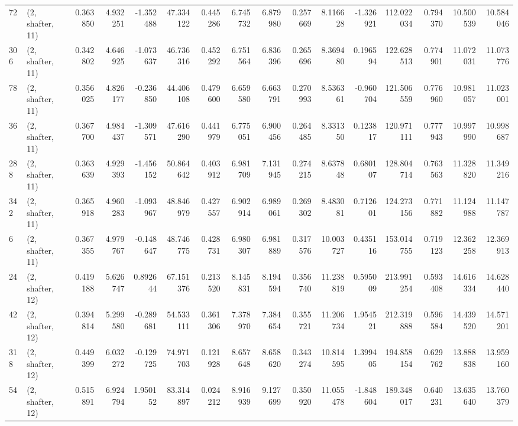 \begin{tabular}{llrrrrrrrrrrrrrr}
72  &  (2, shafter, 11) &   0.363850 &   4.932251 &  -1.352488 &    47.334122 &   0.445286 &   6.745732 &   6.879980 &  0.257669 &   8.116628 &  -1.326921 &   112.022034 &  0.794370 &  10.500539 &  10.584046 \\
306 &  (2, shafter, 11) &   0.342802 &   4.646925 &  -1.073637 &    46.736316 &   0.452292 &   6.751564 &   6.836396 &  0.265696 &   8.369480 &   0.196594 &   122.628513 &  0.774901 &  11.072031 &  11.073776 \\
78  &  (2, shafter, 11) &   0.356025 &   4.826177 &  -0.236850 &    44.406108 &   0.479600 &   6.659580 &   6.663791 &  0.270993 &   8.536361 &  -0.960704 &   121.506559 &  0.776960 &  10.981057 &  11.023001 \\
36  &  (2, shafter, 11) &   0.367700 &   4.984437 &  -1.309571 &    47.616290 &   0.441979 &   6.775051 &   6.900456 &  0.264485 &   8.331350 &   0.123817 &   120.971111 &  0.777943 &  10.997990 &  10.998687 \\
288 &  (2, shafter, 11) &   0.363639 &   4.929393 &  -1.456152 &    50.864642 &   0.403912 &   6.981709 &   7.131945 &  0.274215 &   8.637848 &   0.680107 &   128.804714 &  0.763563 &  11.328820 &  11.349216 \\
342 &  (2, shafter, 11) &   0.365918 &   4.960283 &  -1.093967 &    48.846979 &   0.427557 &   6.902914 &   6.989061 &  0.269302 &   8.483081 &   0.712601 &   124.273156 &  0.771882 &  11.124988 &  11.147787 \\
6   &  (2, shafter, 11) &   0.367355 &   4.979767 &  -0.148647 &    48.746775 &   0.428731 &   6.980307 &   6.981889 &  0.317576 &  10.003727 &   0.435116 &   153.014755 &  0.719123 &  12.362258 &  12.369913 \\
24  &  (2, shafter, 12) &   0.419188 &   5.626747 &   0.892644 &    67.151376 &   0.213520 &   8.145831 &   8.194594 &  0.356740 &  11.238819 &   0.595009 &   213.991254 &  0.593408 &  14.616334 &  14.628440 \\
42  &  (2, shafter, 12) &   0.394814 &   5.299580 &  -0.289681 &    54.533111 &   0.361306 &   7.378970 &   7.384654 &  0.355721 &  11.206734 &   1.954521 &   212.319888 &  0.596584 &  14.439520 &  14.571201 \\
318 &  (2, shafter, 12) &   0.449399 &   6.032272 &  -0.129725 &    74.971703 &   0.121928 &   8.657648 &   8.658620 &  0.343274 &  10.814595 &   1.399405 &   194.858154 &  0.629762 &  13.888838 &  13.959160 \\
54  &  (2, shafter, 12) &   0.515891 &   6.924794 &   1.950152 &    83.314897 &   0.024212 &   8.916939 &   9.127699 &  0.350920 &  11.055478 &  -1.848604 &   189.348017 &  0.640231 &  13.635640 &  13.760379 \\

\end{tabular}
